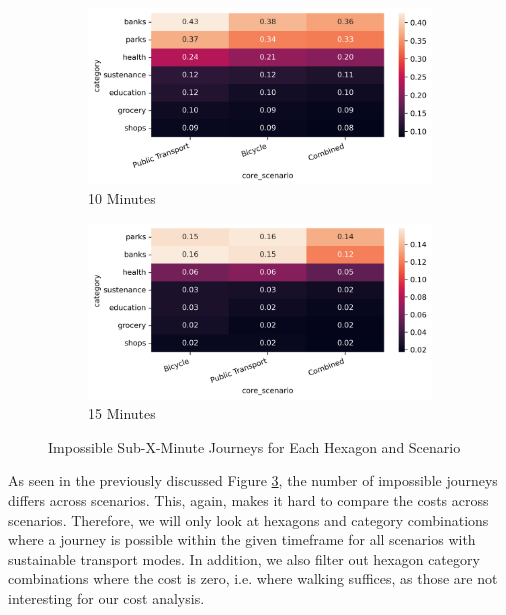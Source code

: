 \begin{figure}
  \centering
  \begin{subfigure}[b]{0.45\textwidth}
    \centering
    \includegraphics[width=\textwidth]{Figures/results/monthly_costs/percentage_inf_10.png}
    \caption{10 Minutes}
    \label{fig:percentage_inf_10}
  \end{subfigure}
  \hfill
  \begin{subfigure}[b]{0.45\textwidth}
    \centering
    \includegraphics[width=\textwidth]{Figures/results/monthly_costs/percentage_inf_15.png}
    \caption{15 Minutes}
    \label{fig:percentage_inf_15}
  \end{subfigure}
  \caption{Impossible Sub-X-Minute Journeys for Each Hexagon and Scenario}
  \label{fig:percentage_inf_x}
\end{figure}

As seen in the previously discussed Figure \ref{fig:percentage_inf_x}, the number of impossible journeys differs across scenarios.
This, again, makes it hard to compare the costs across scenarios.
Therefore, we will only look at hexagons and category combinations where a journey is possible within the given timeframe for all scenarios with sustainable transport modes.
In addition, we also filter out hexagon category combinations where the cost is zero, i.e. where walking suffices, as those are not interesting for our cost analysis.

